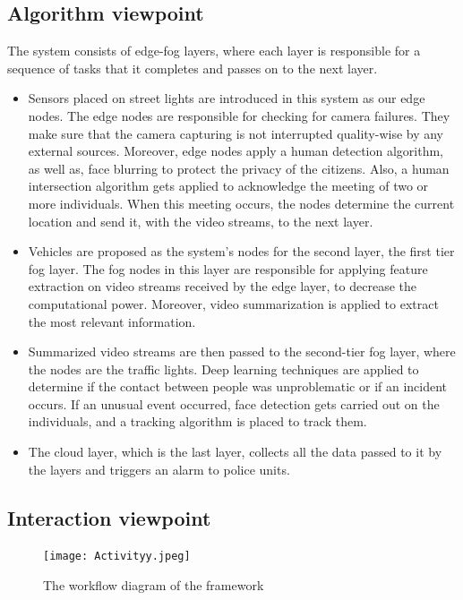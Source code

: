 \documentclass[12pt]{article}
\begin{document}
\subsection{Algorithm viewpoint}
The system consists of edge-fog layers, where each layer is responsible for a sequence of tasks that it completes and passes on to the next layer. 
\begin{itemize}
\item Sensors placed on street lights are introduced in this system as our edge nodes. The edge nodes are responsible for checking for camera failures. They make sure that the camera capturing is not interrupted quality-wise by any external sources. Moreover, edge nodes apply a human detection algorithm, as well as, face blurring to protect the privacy of the citizens. Also, a human intersection algorithm gets applied to acknowledge the meeting of two or more individuals. When this meeting occurs, the nodes determine the current location and send it, with the video streams, to the next layer. 
\item Vehicles are proposed as the system’s nodes for the second layer, the first tier fog layer. The fog nodes in this layer are responsible for applying feature extraction on video streams received by the edge layer, to decrease the computational power. Moreover, video summarization is applied to extract the most relevant information.
\item Summarized video streams are then passed to the second-tier fog layer, where the nodes are the traffic lights. Deep learning techniques are applied to determine if the contact between people was unproblematic or if an incident occurs. If an unusual event occurred, face detection gets carried out on the individuals, and a tracking algorithm is placed to track them.

\item The cloud layer, which is the last layer, collects all the data passed to it by the layers and triggers an alarm to police units.


\end{itemize}
\subsection{Interaction viewpoint}
\begin{figure}[h]
  \centering
  \texttt{[image: Activityy.jpeg]}
  \label{fig:2}
   \caption{The workflow diagram of the framework}
\end{figure}
\end{document}

